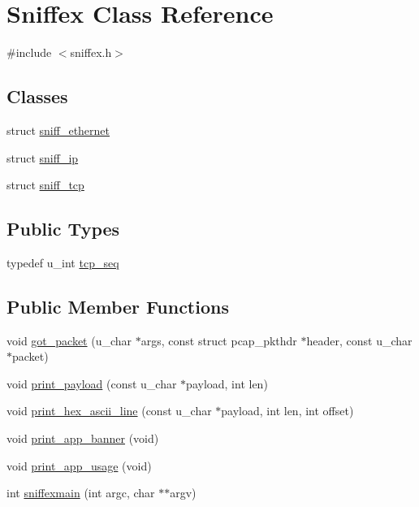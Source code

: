 \hypertarget{class_sniffex}{}\section{Sniffex Class Reference}
\label{class_sniffex}


{\ttfamily \#include $<$sniffex.\+h$>$}

\subsection*{Classes}
\begin{DoxyCompactItemize}
\item 
struct \hyperlink{struct_sniffex_1_1sniff__ethernet}{sniff\+\_\+ethernet}
\item 
struct \hyperlink{struct_sniffex_1_1sniff__ip}{sniff\+\_\+ip}
\item 
struct \hyperlink{struct_sniffex_1_1sniff__tcp}{sniff\+\_\+tcp}
\end{DoxyCompactItemize}
\subsection*{Public Types}
\begin{DoxyCompactItemize}
\item 
typedef u\+\_\+int \hyperlink{class_sniffex_a83629f6a3ec687dd2bb381e9bf157d4f}{tcp\+\_\+seq}
\end{DoxyCompactItemize}
\subsection*{Public Member Functions}
\begin{DoxyCompactItemize}
\item 
void \hyperlink{class_sniffex_a3d4ef3c90e55035eadca2d577004cd14}{got\+\_\+packet} (u\+\_\+char $\ast$args, const struct pcap\+\_\+pkthdr $\ast$header, const u\+\_\+char $\ast$packet)
\item 
void \hyperlink{class_sniffex_a1b24163d441d38f3672800c3de85d149}{print\+\_\+payload} (const u\+\_\+char $\ast$payload, int len)
\item 
void \hyperlink{class_sniffex_aec1e34cb4b2ff906304f957c205707ea}{print\+\_\+hex\+\_\+ascii\+\_\+line} (const u\+\_\+char $\ast$payload, int len, int offset)
\item 
void \hyperlink{class_sniffex_ab32951f576e7cd62caf4fe1c5b085b4e}{print\+\_\+app\+\_\+banner} (void)
\item 
void \hyperlink{class_sniffex_aea81794fe2ac6e2b857eef01c3b109e5}{print\+\_\+app\+\_\+usage} (void)
\item 
int \hyperlink{class_sniffex_a41e146d588c285c94c0beee223d8552b}{sniffexmain} (int argc, char $\ast$$\ast$argv)
\end{DoxyCompactItemize}



